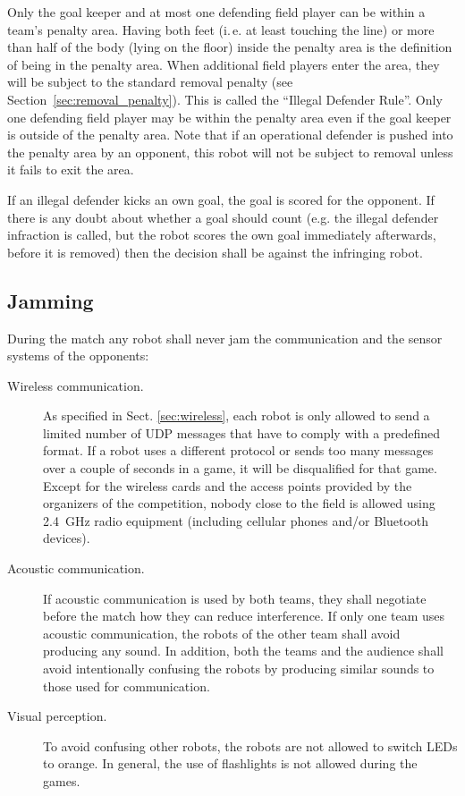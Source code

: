 \documentclass[12pt]{article}
\newcommand{\ie}{\mbox{i.\,e.}\xspace}
\begin{document}
Only the goal keeper and at most one defending field player can be within a team's penalty area. Having both feet (\ie at least touching the line) or more than half of the body (lying on the floor) inside the penalty area is the definition of being in the penalty area. When additional field players enter the area, they will be subject to the standard removal penalty (see Section~\ref{sec:removal_penalty}). This is called the ``Illegal Defender Rule''. Only one defending field player may be within the penalty area even if the goal keeper is outside of the penalty area.  Note that if an operational defender is pushed into the penalty area by an opponent, this robot will not be subject to removal unless it fails to exit the area.

If an illegal defender kicks an own goal, the goal is scored for the opponent. If there is any doubt about whether a goal should count (e.g. the illegal defender infraction is called, but the robot scores the own goal immediately afterwards, before it is removed) then the decision shall be against the infringing robot.

\subsection{Jamming}
\label{sec:jamming}
During the match any robot shall never jam the communication and the sensor systems of the opponents:

\begin{description}

\item[Wireless communication.] As specified in Sect. \ref{sec:wireless}, each robot is only allowed to send a limited number of UDP messages that have to comply with a predefined format. If a robot uses a different protocol or sends too many messages over a couple of seconds in a game, it will be disqualified for that game. Except for the wireless cards and the access points provided by the organizers of the competition, nobody close to the field is allowed using 2.4~GHz radio equipment (including cellular phones and/or Bluetooth devices).

\item[Acoustic communication.] If acoustic communication is used by both teams, they shall negotiate before the match how they can reduce interference. If only one team uses acoustic communication, the robots of the other team shall avoid producing any sound. In addition, both the teams and the audience shall avoid intentionally confusing the robots by producing similar sounds to those used for communication.

\item[Visual perception.] To avoid confusing other robots, the robots are not allowed to switch LEDs to orange. In general, the use of flashlights is not allowed during the games.

\end{description}
\end{document}
